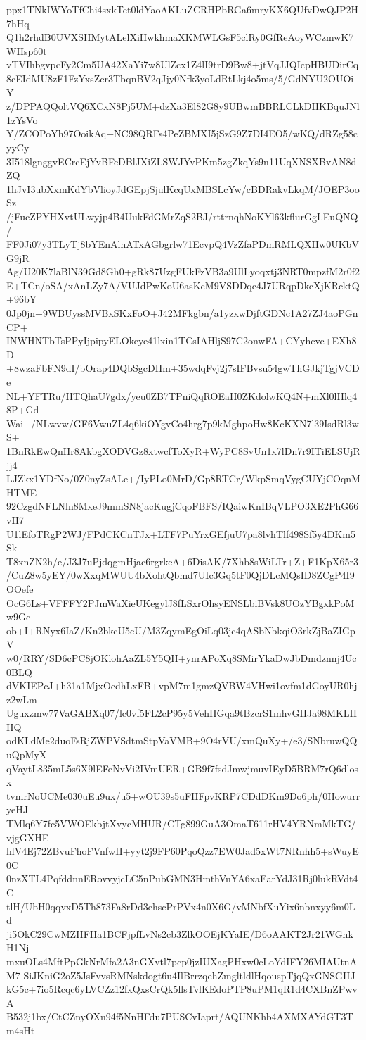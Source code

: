 ppx1TNkIWYoTfChi4sxkTet0ldYaoAKLuZCRHPbRGa6mryKX6QUfvDwQJP2H7hHq
Q1h2rhdB0UVXSHMytALelXiHwkhmaXKMWLGsF5clRy0GfReAoyWCzmwK7WHsp60t
vTVIhbgvpcFy2Cm5UA42XaYi7w8UlZcx1Z4lI9trD9Bw8+jtVqJJQIcpHBUDirCq
8cEIdMU8zF1FzYxsZcr3TbqnBV2qJjy0Nfk3yoLdRtLkj4o5ms/5/GdNYU2OUOiY
z/DPPAQQoltVQ6XCxN8Pj5UM+dzXa3El82G8y9UBwmBBRLCLkDHKBquJNl1zYsVo
Y/ZCOPoYh97OoikAq+NC98QRFs4PeZBMXI5jSzG9Z7DI4EO5/wKQ/dRZg58cyyCy
3I518lgnggvECrcEjYvBFcDBlJXiZLSWJYvPKm5zgZkqYs9n11UqXNSXBvAN8dZQ
1hJvI3ubXxmKdYbVlioyJdGEpjSjulKcqUxMBSLcYw/cBDRakvLkqM/JOEP3ooSz
/jFucZPYHXvtULwyjp4B4UukFdGMrZqS2BJ/rttrnqhNoKYl63kflurGgLEuQNQ/
FF0Ji07y3TLyTj8bYEnAlnATxAGbgrlw71EcvpQ4VzZfaPDmRMLQXHw0UKbVG9jR
Ag/U20K7laBlN39Gd8Gh0+gRk87UzgFUkFzVB3a9UlLyoqxtj3NRT0mpzfM2r0f2
E+TCn/oSA/xAnLZy7A/VUJdPwKoU6asKcM9VSDDqc4J7URqpDkcXjKRcktQ+96bY
0Jp0jn+9WBUyssMVBxSKxFoO+J42MFkgbn/a1yzxwDjftGDNc1A27ZJ4aoPGnCP+
INWHNTbTsPPyIjpipyELOkeye41lxin1TCsIAHljS97C2onwFA+CYyhcvc+EXh8D
+8wzaFbFN9dI/bOrap4DQbSgcDHm+35wdqFvj2j7sIFBvsu54gwThGJkjTgjVCDe
NL+YFTRu/HTQhaU7gdx/yeu0ZB7TPniQqROEaH0ZKdolwKQ4N+mXl0lHlq48P+Gd
Wai+/NLwvw/GF6VwuZL4q6kiOYgvCo4hrg7p9kMghpoHw8KcKXN7l39IsdRl3wS+
1BnRkEwQnHr8AkbgXODVGz8xtwcfToXyR+WyPC8SvUn1x7lDn7r9ITiELSUjRjj4
LJZkx1YDfNo/0Z0nyZsALe+/IyPLo0MrD/Gp8RTCr/WkpSmqVygCUYjCOqnMHTME
92CzgdNFLNln8MxeJ9mmSN8jacKugjCqoFBFS/IQaiwKnIBqVLPO3XE2PhG66vH7
U1lEfoTRgP2WJ/FPdCKCnTJx+LTF7PuYrxGEfjuU7pa8lvhTlf498Sf5y4DKm5Sk
T8xnZN2h/e/J3J7uPjdqgmHjac6rgrkeA+6DisAK/7Xhb8sWiLTr+Z+F1KpX65r3
/CuZ8w5yEY/0wXxqMWUU4bXohtQbmd7UIc3Gq5tF0QjDLcMQsID8ZCgP4I9OOefe
OcG6Ls+VFFFY2PJmWaXieUKegylJ8fLSxrOhsyENSLbiBVsk8UOzYBgxkPoMw9Gc
ob+I+RNyx6IaZ/Kn2bkcU5cU/M3ZqymEgOiLq03jc4qASbNbkqiO3rkZjBaZIGpV
w0/RRY/SD6cPC8jOKlohAaZL5Y5QH+ynrAPoXq8SMirYkaDwJbDmdznnj4Uc0BLQ
dVKIEPcJ+h31a1MjxOcdhLxFB+vpM7m1gmzQVBW4VHwi1ovfm1dGoyUR0hjz2wLm
Uguxzmw77VaGABXq07/lc0vf5FL2cP95y5VehHGqa9tBzcrS1mhvGHJa98MKLHHQ
odKLdMe2duoFsRjZWPVSdtmStpVaVMB+9O4rVU/xmQuXy+/e3/SNbruwQQuQpMyX
qVaytL835mL5s6X9lEFeNvVi2IVmUER+GB9f7fsdJmwjmuvIEyD5BRM7rQ6dlosx
tvmrNoUCMe030uEu9ux/u5+wOU39s5uFHFpvKRP7CDdDKm9Do6ph/0HowurryeHJ
TMlq6Y7fc5VWOEkbjtXvycMHUR/CTg899GuA3OmaT611rHV4YRNmMkTG/vjgGXHE
hlV4Ej72ZBvuFhoFVnfwH+yyt2j9FP60PqoQzz7EW0Jad5xWt7NRnhh5+sWuyE0C
0nzXTL4PqfddnnERovvyjcLC5nPubGMN3HmthVnYA6xaEarYdJ31Rj0lukRVdt4C
tlH/UbH0qqvxD5Th873Fa8rDd3ehscPrPVx4n0X6G/vMNbfXuYix6nbnxyy6m0Ld
ji5OkC29CwMZHFHa1BCFjpfLvNs2cb3ZlkOOEjKYaIE/D6oAAKT2Jr21WGnkH1Nj
mxuOLs4MftPpGkNrMfa2A3nGXvtl7pcp0jzIUXagPHxw0cLoYdIFY26MIAUtnAM7
SiJKniG2oZ5JsFvvsRMNskdogt6u4IlBrrzqehZmgltldlHqouspTjqQxGNSGIIJ
kG5c+7io5Rcqc6yLVCZz12fxQxsCrQk5llsTvlKEdoPTP8uPM1qR1d4CXBnZPwvA
B532j1bx/CtCZnyOXn94f5NnHFdu7PUSCvIaprt/AQUNKhb4AXMXAYdGT3Tm4sHt
